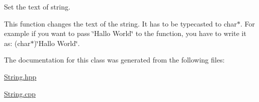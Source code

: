 Set the text of string. 

This function changes the text of the string. It has to be typecasted to char$\ast$. For example if you want to pass \char`\"{}\+Hallo World\char`\"{} to the function, you have to write it as\+: (char$\ast$)\char`\"{}\+Hallo World\char`\"{}. 

The documentation for this class was generated from the following files\+:\begin{DoxyCompactItemize}
\item 
\hyperlink{_string_8hpp}{String.\+hpp}\item 
\hyperlink{_string_8cpp}{String.\+cpp}\end{DoxyCompactItemize}
